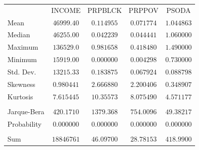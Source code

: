 \documentclass[12pt]{report}
\begin{document}
\vspace{-\baselineskip}
\begin{table}[H]
	\centering
	\begin{tabular}{lrrrr}
		\multicolumn{1}{c}{}&\multicolumn{1}{c}{INCOME}&\multicolumn{1}{c}{PRPBLCK}&\multicolumn{1}{c}{PRPPOV}&\multicolumn{1}{c}{PSODA}\\
		\multicolumn{1}{l}{Mean}&\multicolumn{1}{c}{$46999.40$}&\multicolumn{1}{c}{$0.114955$}&\multicolumn{1}{c}{$0.071774$}&\multicolumn{1}{c}{$1.044863$}\\
		\multicolumn{1}{l}{Median}&\multicolumn{1}{c}{$46255.00$}&\multicolumn{1}{c}{$0.042239$}&\multicolumn{1}{c}{$0.044441$}&\multicolumn{1}{c}{$1.060000$}\\
		\multicolumn{1}{l}{Maximum}&\multicolumn{1}{c}{$136529.0$}&\multicolumn{1}{c}{$0.981658$}&\multicolumn{1}{c}{$0.418480$}&\multicolumn{1}{c}{$1.490000$}\\
		\multicolumn{1}{l}{Minimum}&\multicolumn{1}{c}{$15919.00$}&\multicolumn{1}{c}{$0.000000$}&\multicolumn{1}{c}{$0.004298$}&\multicolumn{1}{c}{$0.730000$}\\
		\multicolumn{1}{l}{Std. Dev.}&\multicolumn{1}{c}{$13215.33$}&\multicolumn{1}{c}{$0.183875$}&\multicolumn{1}{c}{$0.067924$}&\multicolumn{1}{c}{$0.088798$}\\
		\multicolumn{1}{l}{Skewness}&\multicolumn{1}{c}{$0.980441$}&\multicolumn{1}{c}{$2.666880$}&\multicolumn{1}{c}{$2.200406$}&\multicolumn{1}{c}{$0.348907$}\\
		\multicolumn{1}{l}{Kurtosis}&\multicolumn{1}{c}{$7.615445$}&\multicolumn{1}{c}{$10.35573$}&\multicolumn{1}{c}{$8.075490$}&\multicolumn{1}{c}{$4.571177$}\\
		\multicolumn{1}{c}{}&\multicolumn{1}{c}{}&\multicolumn{1}{c}{}&\multicolumn{1}{c}{}&\multicolumn{1}{c}{}\\
		\multicolumn{1}{l}{Jarque-Bera}&\multicolumn{1}{c}{$420.1710$}&\multicolumn{1}{c}{$1379.368$}&\multicolumn{1}{c}{$754.0096$}&\multicolumn{1}{c}{$49.38217$}\\
		\multicolumn{1}{l}{Probability}&\multicolumn{1}{c}{$0.000000$}&\multicolumn{1}{c}{$0.000000$}&\multicolumn{1}{c}{$0.000000$}&\multicolumn{1}{c}{$0.000000$}\\
		\multicolumn{1}{c}{}&\multicolumn{1}{c}{}&\multicolumn{1}{c}{}&\multicolumn{1}{c}{}&\multicolumn{1}{c}{}\\
		\multicolumn{1}{l}{Sum}&\multicolumn{1}{c}{$18846761$}&\multicolumn{1}{c}{$46.09700$}&\multicolumn{1}{c}{$28.78153$}&\multicolumn{1}{c}{$418.9900$}\\

\end{tabular}
\end{table}
\end{document}
